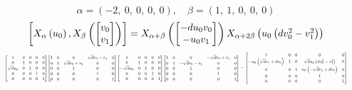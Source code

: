 \documentclass[11pt]{article}
\theoremstyle{definition}
\begin{document}
\[
\alpha = \left( -2, \  0, \  0, \  0, \  0\right), \quad \beta = \left( 1, \  1, \  0, \  0, \  0\right)
\]
\[
\scaletoalign{\textwidth}{\left[ X_{\alpha}\left(u_{0}\right), X_{\beta}\left(\left[\begin{matrix}v_{0}\\v_{1}\end{matrix}\right]\right) \right] = X_{\alpha + \beta}\left(\left[\begin{matrix}- d u_{0} v_{0}\\- u_{0} v_{1}\end{matrix}\right]\right) X_{\alpha + 2\beta}\left(u_{0} \left(d v_{0}^{2} - v_{1}^{2}\right)\right)}
\]
\[
\scaletoalign{\textwidth}{{\left[\begin{matrix}1 & 0 & 0 & 0 & 0\\0 & 1 & 0 & 0 & 0\\\sqrt{d} u_{0} & 0 & 1 & 0 & 0\\0 & 0 & 0 & 1 & 0\\0 & 0 & 0 & 0 & 1\end{matrix}\right]} {\left[\begin{matrix}1 & 0 & 0 & \sqrt{d} v_{0} - v_{1} & 0\\0 & 1 & \sqrt{d} v_{0} + v_{1} & 0 & 0\\0 & 0 & 1 & 0 & 0\\0 & 0 & 0 & 1 & 0\\0 & 0 & 0 & 0 & 1\end{matrix}\right]} {\left[\begin{matrix}1 & 0 & 0 & 0 & 0\\0 & 1 & 0 & 0 & 0\\- \sqrt{d} u_{0} & 0 & 1 & 0 & 0\\0 & 0 & 0 & 1 & 0\\0 & 0 & 0 & 0 & 1\end{matrix}\right]} {\left[\begin{matrix}1 & 0 & 0 & - \sqrt{d} v_{0} + v_{1} & 0\\0 & 1 & - \sqrt{d} v_{0} - v_{1} & 0 & 0\\0 & 0 & 1 & 0 & 0\\0 & 0 & 0 & 1 & 0\\0 & 0 & 0 & 0 & 1\end{matrix}\right]} = {\left[\begin{matrix}1 & 0 & 0 & 0 & 0\\- u_{0} \left(\sqrt{d} v_{1} + d v_{0}\right) & 1 & 0 & \sqrt{d} u_{0} \left(d v_{0}^{2} - v_{1}^{2}\right) & 0\\0 & 0 & 1 & u_{0} \left(- \sqrt{d} v_{1} + d v_{0}\right) & 0\\0 & 0 & 0 & 1 & 0\\0 & 0 & 0 & 0 & 1\end{matrix}\right]}}
\]
\end{document}
